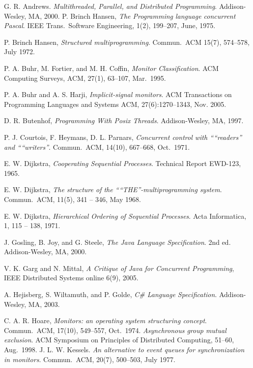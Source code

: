 \documentclass[preprint]{sigplanconf}
\begin{document}
\begin{thebibliography}{}
\softraggedright

    G. R. Andrews. \emph{Multithreaded, Parallel, and Distributed Programming}.
    Addison-Wesley, MA, 2000.  
  P. Brinch Hansen, \emph{The Programming language concurrent Pascal}. IEEE
  Trans.~Software Engineering, 1(2), 199--207, June, 1975.

    P. Brinch Hansen, \emph{Structured multiprogramming}. Commun.~ACM 15(7),
    574--578, July 1972.

  P. A. Buhr, M. Fortier, and M. H. Coffin, \emph{Monitor Classification}. ACM 
  Computing Surveys, ACM, 27(1), 63--107, 
  Mar.~1995.
  
  P. A. Buhr and A. S. Harji, \emph{Implicit-signal monitors}. ACM 
  Transactions on Programming Languages and Systems ACM, 27(6):1270--1343, 
  Nov. 2005.

  D. R. Butenhof, \emph{Programming With Posix Threads}.
  Addison-Wesley, MA, 1997.

    P. J. Courtois, F. Heymans, D. L. Parnars, \emph{Concurrent control with
    “``readers'' and “``writers''}. Commun.~ACM, 14(10), 667--668, Oct.~1971.

    E. W. Dijkstra, \emph{Cooperating Sequential Processes}.  Technical Report
    EWD-123, 1965. 
    
    E. W. Dijkstra, \emph{The structure of the “``THE''-multiprogramming
    system}. Commun.~ACM, 11(5), 341 -- 346, May 1968. 

    E. W. Dijkstra, \emph{Hierarchical Ordering of Sequential Processes}. Acta
    Informatica, 1, 115 -- 138, 1971.

    J. Gosling, B. Joy, and G. Steele, \emph{The Java Language Specification}.
    2nd ed. Addison-Wesley, MA, 2000. 

    V. K. Garg and N. Mittal, \emph{A Critique of Java for Concurrent
    Programming}, IEEE Distributed Systems online 6(9), 2005.

    A. Hejisberg, S. Wiltamuth, and P. Golde, \emph{C\# Language
    Specification}. Addison-Wesley, MA, 2003.

  C. A. R. Hoare, \emph{Monitors: an operating system structuring concept}. 
  Commun.~ACM, 17(10), 549--557, Oct.~1974. 
 \emph{Asynchronous group mutual exclusion}. ACM Symposium on 
    Principles of Distributed Computing, 51--60, Aug.~1998. 
    J. L. W. Kessels. \emph{An alternative to event queues for synchronization 
    in monitors}. Commun.~ACM, 20(7), 500--503, July 1977.
  

\end{thebibliography}
\end{document}
